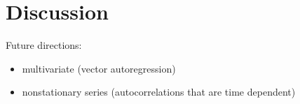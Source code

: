 \documentclass[latex/main.tex]{subfiles}
\begin{document}
\section{Discussion}

Future directions:

\begin{itemize}
    \item multivariate (vector autoregression)
    \item nonstationary series (autocorrelations that are time dependent)
\end{itemize}
\end{document}
